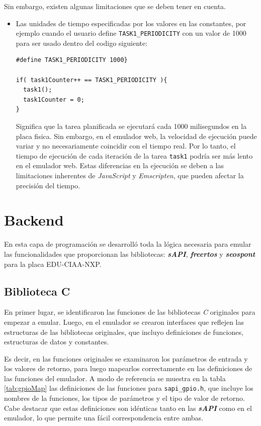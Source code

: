 Sin embargo, existen algunas limitaciones que se deben tener en cuenta.

\begin{itemize}
	\item Las unidades de tiempo especificadas por los valores en las constantes, por ejemplo cuando el usuario define \texttt{TASK1\_PERIODICITY} con un valor de 1000 para ser usado dentro del codigo siguiente: 
	
\begin{lstlisting}[caption={Ejemplo TASK1\_PERIODICITY}]
#define TASK1_PERIODICITY 1000} 

if( task1Counter++ == TASK1_PERIODICITY ){
  task1();
  task1Counter = 0;
}
\end{lstlisting}	
	


Significa que la tarea  planificada se ejecutará cada 1000 milisegundos en la placa fisica. Sin embargo, en el emulador web, la velocidad de ejecución puede variar y no necesariamente coincidir con el tiempo real. Por lo tanto, el tiempo de ejecución de cada iteración de la tarea \texttt{task1} podría ser más lento en el emulador web. Estas diferencias en la ejecución se deben a las limitaciones inherentes de \textit{JavaScript} y \textit{Emscripten}, que pueden afectar la precisión del tiempo.

\end{itemize}

\section{Backend}

En esta capa de programación se desarrolló toda la lógica necesaria para emular las funcionalidades que proporcionan las bibliotecas: \textit{\textbf{sAPI}}, \textit{\textbf{freertos}} y \textit{\textbf{seos\textunderscore pont}} para la placa EDU-CIAA-NXP.

\subsection{Biblioteca C}

En primer lugar, se identificaron las funciones de las bibliotecas \textit{C} originales para empezar a emular. Luego, en el emulador se crearon interfaces que reflejen las estructuras de las bibliotecas originales, que incluyo definiciones de funciones, estructuras de datos y constantes.

Es decir, en las funciones originales se examinaron los parámetros de entrada y los valores de retorno, para luego mapearlos correctamente en las definiciones de las funciones del emulador.  A modo de referencia se muestra en la tabla \ref{tab:gpioMap} las definiciones de las funciones para \texttt{sapi\_gpio.h}, que incluye los nombres de la funciones, los tipos de parámetros y el tipo de valor de retorno. Cabe destacar que estas definiciones son idénticas tanto en las \textit{\textbf{sAPI}} como en el emulador, lo que permite una fácil correspondencia entre ambas.

